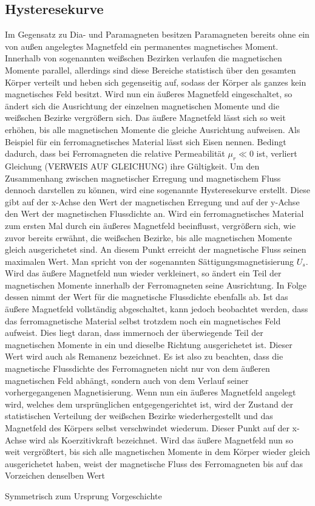 \subsection{Hysteresekurve}
Im Gegensatz zu Dia- und Paramagneten besitzen Paramagneten bereits ohne ein von außen angelegtes Magnetfeld
ein permanentes magnetisches Moment. Innerhalb von sogenannten weißschen Bezirken verlaufen die magnetischen Momente
parallel, allerdings sind diese Bereiche statistisch über den gesamten Körper verteilt und heben sich gegenseitig auf,
sodass der Körper als ganzes kein magnetisches Feld besitzt. Wird nun ein äußeres Magnetfeld eingeschaltet, so ändert 
sich die Ausrichtung der einzelnen magnetischen Momente und die weißschen Bezirke vergrößern sich. Das äußere Magnetfeld 
lässt sich so weit erhöhen, bis alle magnetischen Momente die gleiche Ausrichtung aufweisen. Als Beispiel für ein
ferromagnetisches Material lässt sich Eisen nennen.
\noindent
Bedingt dadurch, dass bei Ferromagneten die relative Permeabilität $\mu_r \ll 0$ ist, verliert Gleichung (VERWEIS AUF GLEICHUNG)
ihre Gültigkeit. Um den Zusammenhang zwischen magnetischer Erregung und magnetischem Fluss dennoch darstellen zu können, wird
eine sogenannte Hysteresekurve erstellt. Diese gibt auf der x-Achse den Wert der magnetischen Erregung und auf der y-Achse
den Wert der magnetischen Flussdichte an. 
Wird ein ferromagnetisches Material zum ersten Mal durch ein äußeres Magnetfeld beeinflusst, vergrößern sich, wie zuvor
bereits erwähnt, die weißschen Bezirke, bis alle magnetischen Momente gleich ausgerichetet sind. An diesem Punkt erreicht 
der magnetische Fluss seinen maximalen Wert. Man spricht von der sogenannten Sättigungsmagnetisierung $U_s$. Wird
das äußere Magnetfeld nun wieder verkleinert, so ändert ein Teil der magnetischen Momente innerhalb der Ferromagneten 
seine Ausrichtung. In Folge dessen nimmt der Wert für die magnetische Flussdichte ebenfalls ab. Ist das äußere Magnetfeld
vollständig abgeschaltet, kann jedoch beobachtet werden, dass das ferromagnetische Material selbst trotzdem noch ein magnetisches
Feld aufweist. Dies liegt daran, dass immernoch der überwiegende Teil der magnetischen Momente in ein und dieselbe Richtung 
ausgerichetet ist. Dieser Wert wird auch als Remanenz bezeichnet. Es ist also zu beachten, dass die magnetische Flussdichte 
des Ferromagneten nicht nur von dem äußeren magnetischen Feld abhängt, sondern auch von dem Verlauf seiner vorhergegangenen 
Magnetisierung. Wenn nun ein äußeres Magnetfeld angelegt wird, welches dem ursprünglichen entgegengerichtet ist, wird der Zustand
der statistischen Verteilung der weißschen Bezirke wiederhergestellt und das Magnetfeld des Körpers selbst verschwindet wiederum.
Dieser Punkt auf der x-Achse wird als Koerzitivkraft bezeichnet. Wird das äußere Magnetfeld nun so weit vergrößtert, bis sich alle 
magnetischen Momente in dem Körper wieder gleich ausgerichetet haben, weist der magnetische Fluss des Ferromagneten bis auf das Vorzeichen 
denselben Wert  


Symmetrisch zum Ursprung
Vorgeschichte







\cite{sample}
